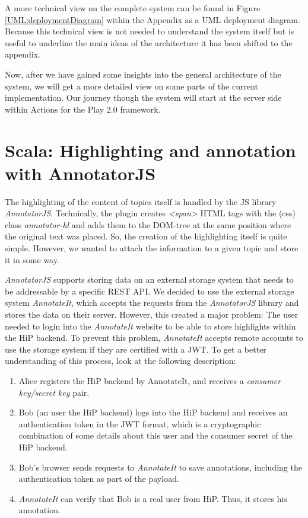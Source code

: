 A more technical view on the complete system can be found in Figure \ref{UML:deploymentDiagram} within the Appendix as a \ac{UML} deployment diagram. Because this technical view is not needed to understand the system itself but is useful to underline the main ideas of the architecture it has been shifted to the appendix.

Now, after we have gained some insights into the general architecture of the system, we will get a more detailed view on some parts of the current implementation. Our journey though the system will start at the server side within Actions for the Play 2.0 framework.

\section{Scala: Highlighting and annotation with AnnotatorJS}
The highlighting of the content of topics itself is handled by the \ac{JS} library \emph{AnnotatorJS}. Technically, the plugin creates \emph{<span>} \ac{HTML} tags with the (css) class \emph{annotator-hl} and adds them to the \ac{DOM}-tree at the same position where the original text was placed. So, the creation of the highlighting itself is quite simple. However, we wanted to attach the information to a given topic and store it in some way.  

\emph{AnnotatorJS} supports storing data on an external storage system that needs to be addressable by a specific \ac{REST} \ac{API}. We decided to use the external storage system \emph{AnnotateIt}, which accepts the requests from the \emph{AnnotatorJS} library and stores the data on their server. However, this created a major problem: The user needed to login into the \emph{AnnotateIt} website to be able to store highlights within the \ac{HiP} backend. To prevent this problem, \emph{AnnotateIt} accepts remote accounts to use the storage system if they are certified with a \ac{JWT}. To get a better understanding of this process, look at the following description:

\begin{enumerate}
\item Alice registers the \ac{HiP} backend by AnnotateIt, and receives a \emph{consumer key/secret key} pair.
\item Bob (an user the \ac{HiP} backend) logs into the \ac{HiP} backend and receives an authentication token in the \ac{JWT} format, which is a cryptographic combination of some details about this user and the consumer secret of the \ac{HiP} backend.
\item Bob's browser sends requests to \emph{AnnotateIt} to save annotations, including the authentication token as part of the payload.
\item \emph{AnnotateIt} can verify that Bob is a real user from \ac{HiP}. Thus, it stores his annotation.
\end{enumerate}

